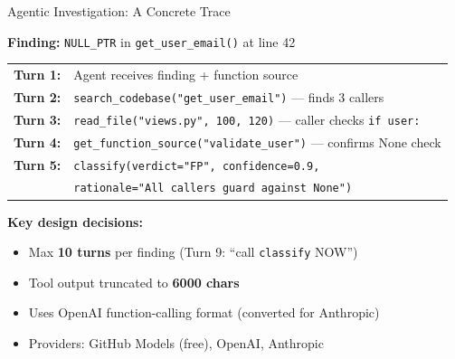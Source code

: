 \documentclass[aspectratio=169]{beamer}
\begin{document}
\begin{frame}[fragile]{Agentic Investigation: A Concrete Trace}

\textbf{Finding:} \texttt{NULL\_PTR} in \texttt{get\_user\_email()} at line 42

\vspace{0.3em}
\begin{tabular}{rp{11cm}}
\textbf{Turn 1:} & Agent receives finding + function source \\
\textbf{Turn 2:} & \texttt{search\_codebase("get\_user\_email")} --- finds 3 callers \\
\textbf{Turn 3:} & \texttt{read\_file("views.py", 100, 120)} --- caller checks \texttt{if user:} \\
\textbf{Turn 4:} & \texttt{get\_function\_source("validate\_user")} --- confirms None check \\
\textbf{Turn 5:} & \texttt{classify(verdict="FP", confidence=0.9,}\\
                 & \texttt{rationale="All callers guard against None")} \\
\end{tabular}

\vspace{0.5em}
\textbf{Key design decisions:}
\begin{itemize}
  \item Max \textbf{10 turns} per finding (Turn 9: ``call \texttt{classify} NOW'')
  \item Tool output truncated to \textbf{6000 chars}
  \item Uses OpenAI function-calling format (converted for Anthropic)
  \item Providers: GitHub Models (free), OpenAI, Anthropic
\end{itemize}

\end{frame}
\end{document}
